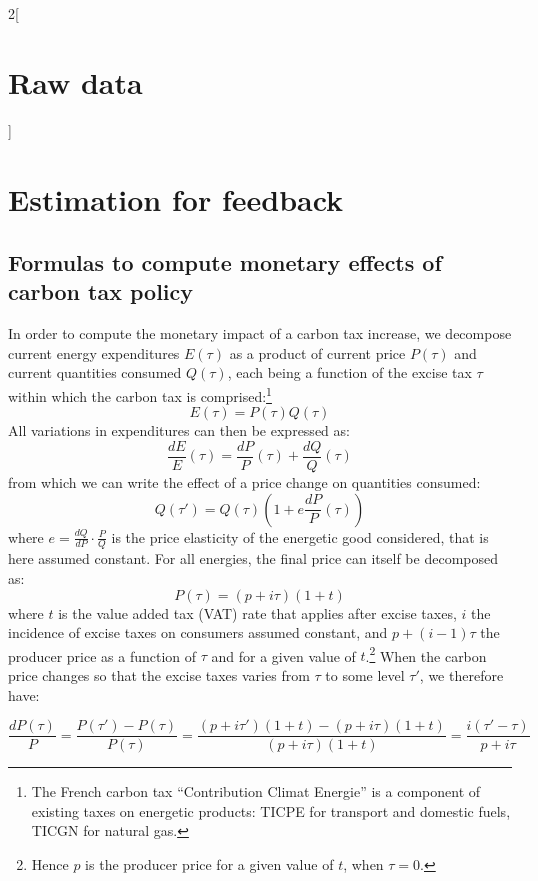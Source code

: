 \documentclass[11pt]{article}
\renewcommand{\arraystretch}{0.73}
\begin{document}
\begin{appendices}
\begin{multicols}{2}[\section{Raw data\label{sec:Raw-Data}}]
\end{multicols}
\renewcommand{\arraystretch}{0.73}

\section{Estimation for feedback \label{subsec:app_estimation_feedback}}

    \subsection{Formulas to compute monetary effects of carbon tax policy \label{appendix:formulas}}

In order to compute the monetary impact of a carbon tax increase, we decompose current energy expenditures $E(\tau)$ as a product of current price $P(\tau)$ and current quantities consumed $Q(\tau)$, each being a function of the excise tax $\tau$ within which the carbon tax is comprised:\footnote{The French carbon tax ``Contribution Climat Energie'' is a component of existing taxes on energetic products: TICPE for transport and domestic fuels, TICGN for natural gas.}
$$
E\left( \tau \right) = P\left( \tau \right) Q\left(\tau\right)
$$
\noindent
All variations in expenditures can then be expressed as:
$$
\frac{dE}{E}\left(\tau\right) = \frac{dP}{P}\left(\tau\right) + \frac{dQ}{Q}\left(\tau\right)
$$
\noindent
from which we can write the effect of a price change on quantities consumed:
$$
Q\left(\tau '\right) = Q\left(\tau\right) \left(1 + e\frac{dP}{P}\left(\tau\right)\right)
$$
\noindent
where $e = \frac{dQ}{dP} \cdot \frac{P}{Q}$ is the price elasticity of the energetic good considered, that is here assumed constant. For all energies, the final price can itself be decomposed as:
$$
P\left(\tau\right) = \left(p+i\tau\right)\left(1+t\right)
$$
\noindent
where $t$ is the value added tax (VAT) rate that applies after excise taxes, $i$ the incidence of excise taxes on consumers assumed constant, and $p + \left(i-1\right)\tau$ the producer price as a function of $\tau$ and for a given value of $t$.\footnote{Hence $p$ is the producer price for a given value of $t$, when $\tau = 0$.} When the carbon price changes so that the excise taxes varies from $\tau$ to some level $\tau'$, we therefore have: 

$$
\frac{dP\left(\tau\right)}{P} = \frac{P\left(\tau '\right) - P\left(\tau\right)}{P\left(\tau\right)} = \frac{\left(p + i \tau '\right)\left(1+t\right) -  \left(p + i \tau\right)\left(1+t\right)}{\left(p + i \tau\right)\left(1+t\right)} = \frac{i\left(\tau' - \tau\right)}{p + i \tau}$$


\end{appendices}
\end{document}
